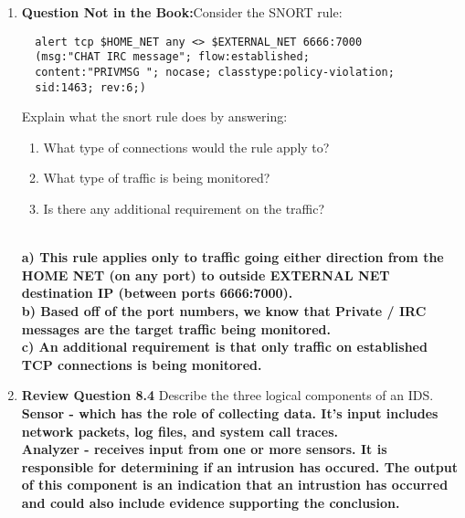 \documentclass[12pt]{article}
\begin{document}
\renewcommand{\headrulewidth}{0.4pt}
\vspace{-3mm}
\begin{enumerate}
  \item \textbf{Question Not in the Book:}Consider the SNORT rule:
  \vspace{-1em}

  {\color{blue}
  \begin{verbatim}
  alert tcp $HOME_NET any <> $EXTERNAL_NET 6666:7000
  (msg:"CHAT IRC message"; flow:established;
  content:"PRIVMSG "; nocase; classtype:policy-violation;
  sid:1463; rev:6;)
  \end{verbatim}
  }
   Explain what the  snort rule does by answering:
   \begin{enumerate}
     \item What type of connections would the rule apply to?
     \item What type of traffic is being monitored?
     \item Is there any additional requirement on the traffic?
   \end{enumerate} \\

  \textbf{a) This rule applies only to traffic going either direction from the HOME NET (on any port) to outside EXTERNAL NET destination IP (between ports 6666:7000).} \\

  \textbf{b) Based off of the port numbers, we know that Private / IRC messages are the target traffic being monitored.} \\

  \textbf{c) An additional requirement is that only traffic on established TCP connections is being monitored.} \\

  \item \textbf{Review Question 8.4} Describe the three logical components of an IDS.\\

  \textbf{Sensor - which has the role of collecting data. It's input includes network packets, log files, and system call traces.} \\

  \textbf{Analyzer - receives input from one or more sensors. It is responsible for determining if an intrusion has occured. The output of this component is an indication that an intrustion has occurred and could also include evidence supporting the conclusion.} \\


\end{enumerate}
\end{document}
